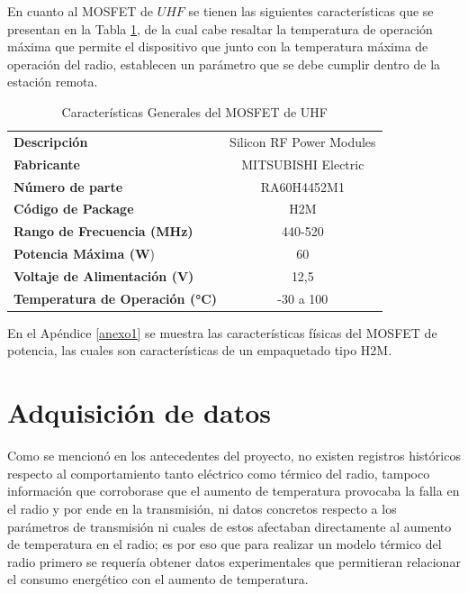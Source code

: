 En cuanto al MOSFET de $UHF$ se tienen las siguientes características que se presentan en la Tabla \ref{mosfet}, de la cual cabe resaltar la temperatura de operación máxima que permite el dispositivo que junto con la temperatura máxima de operación del radio, establecen un parámetro que se debe cumplir dentro de la estación remota.  \cite{mosfet}

\begin{table}[H]
\centering
\caption{Características Generales del MOSFET de UHF}
\label{mosfet}
\begin{tabular}{lc}
\toprule
{\color[HTML]{000000} \textbf{Descripción}} & Silicon RF Power Modules \\
\textbf{Fabricante}                         & MITSUBISHI Electric      \\
\textbf{Número de parte}                    & RA60H4452M1              \\
\textbf{Código de Package}                  & H2M                      \\
\textbf{Rango de Frecuencia (\si{\mega\hertz})}          & 440-520                  \\
\textbf{Potencia Máxima (\si{\watt}})                & 60                       \\
\textbf{Voltaje de Alimentación (\si{\volt})}   & 12,5                     \\
\textbf{Temperatura de Operación (\si{\celsius})}      & -30 a 100                \\ \bottomrule
\end{tabular}
\end{table}

En el Apéndice \ref{anexo1} se muestra las características físicas del MOSFET de potencia, las cuales son características de un empaquetado tipo H2M.

\section{Adquisición de datos}

Como se mencionó en los antecedentes del proyecto, no existen registros históricos respecto al comportamiento tanto eléctrico como térmico del radio, tampoco información que corroborase que el aumento de temperatura provocaba la falla en el radio y por ende en la transmisión, ni datos concretos respecto a los parámetros de transmisión ni cuales de estos afectaban directamente al aumento de temperatura en el radio; es por eso que para realizar un modelo térmico del radio primero se requería obtener datos experimentales que permitieran relacionar el consumo energético con el aumento de temperatura. 


